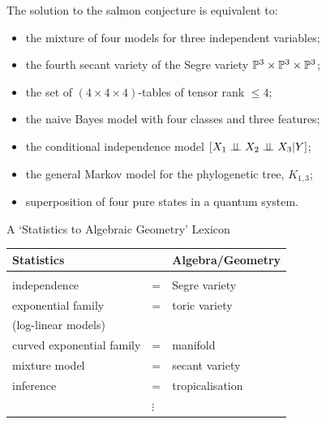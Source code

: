 \begin{frame}

The solution to the salmon conjecture is equivalent to:
    \begin{itemize}
        \item the mixture of four models for three independent variables;
        \item the fourth secant variety of the Segre variety $\mathbb{P}^{3} \times \mathbb{P}^{3} \times \mathbb{P}^{3}$;
        \item the set of $(4 \times 4 \times 4)$-tables of tensor rank $\leq 4$;
        \item the naive Bayes model with four classes and three features;
        \item the conditional independence model $[ X_{1} \perp \!\!\! \perp X_{2} \perp \!\!\! \perp X_{3} | Y ]$;
        \item the general Markov model for the phylogenetic tree, $K_{1,3}$;
        \item superposition of four pure states in a quantum system.
    \end{itemize}

\end{frame}

\begin{frame}

    \begin{block}{A `Statistics to Algebraic Geometry' Lexicon}

    \begin{table}[]
    \begin{tabular}{lll}
    Statistics                &   & Algebra/Geometry \\ \hline
                              &   &                  \\ 
    independence              & = & Segre variety    \\ 
    exponential family        & = & toric variety    \\ 
    (log-linear models)       &   &                  \\ 
    curved exponential family & = & manifold         \\ 
    mixture model             & = & secant variety   \\
    inference                 & = & tropicalisation  \\
                              & $\vdots$ &           
    \end{tabular}
    \end{table}

    \end{block}

\end{frame}

